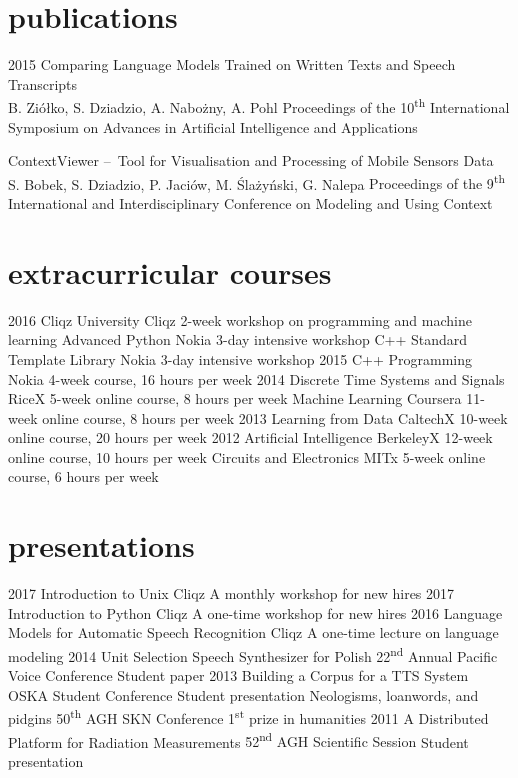 \documentclass[]{friggeri-cv_osx}
\begin{document}
\section{publications}
\begin{entrylist}
\entry
{2015}
{Comparing Language Models Trained on Written Texts and Speech Transcripts\\}
{B. Ziółko, S. Dziadzio, A. Nabożny, A. Pohl}
{Proceedings of the 10\textsuperscript{th} International Symposium on Advances in Artificial Intelligence and Applications\\}

\entry
{}
{ContextViewer – Tool for Visualisation and Processing of Mobile Sensors Data\\}
{S. Bobek, S. Dziadzio, P. Jaciów, M. Ślażyński, G. Nalepa}
{Proceedings of the 9\textsuperscript{th} International and Interdisciplinary Conference on Modeling and Using Context\\}
\end{entrylist}


\section{extracurricular courses}
\begin{entrylist}
\entry
{2016}
{Cliqz University}
{Cliqz}
{2-week workshop on programming and machine learning}
\entry
{}
{Advanced Python}
{Nokia}
{3-day intensive workshop}
\entry
{}
{C++ Standard Template Library}
{Nokia}
{3-day intensive workshop}
\entry
{2015}
{C++ Programming}
{Nokia}
{4-week course, 16 hours per week}
\entry
{2014}
{Discrete Time Systems and Signals}
{RiceX}
{5-week online course, 8 hours per week}
\entry
{}
{Machine Learning}
{Coursera}
{11-week online course, 8 hours per week}
\entry
{2013}
{Learning from Data}
{CaltechX}
{10-week online course, 20 hours per week}
\entry
{2012}
{Artificial Intelligence}
{BerkeleyX}
{12-week online course, 10 hours per week}
\entry
{}
{Circuits and Electronics}
{MITx}
{5-week online course, 6 hours per week\\}
\end{entrylist}


\section{presentations}
\begin{entrylist}
\entry
{2017}
{Introduction to Unix}
{Cliqz}
{A monthly workshop for new hires}
\entry
{2017}
{Introduction to Python}
{Cliqz}
{A one-time workshop for new hires}
\entry
{2016}
{Language Models for Automatic Speech Recognition}
{Cliqz}
{A one-time lecture on language modeling}
\entry
{2014}
{Unit Selection Speech Synthesizer for Polish}
{22\textsuperscript{nd} Annual Pacific Voice Conference}
{Student paper}
\entry
{2013}
{Building a Corpus for a TTS System}
{OSKA Student Conference}
{Student presentation}
\entry
{}
{Neologisms, loanwords, and pidgins}
{50\textsuperscript{th} AGH SKN Conference}
{1\textsuperscript{st} prize in humanities}
\entry
{2011}
{A Distributed Platform for Radiation Measurements}
{52\textsuperscript{nd} AGH Scientific Session}
{Student presentation}
\end{entrylist}
\end{document}
